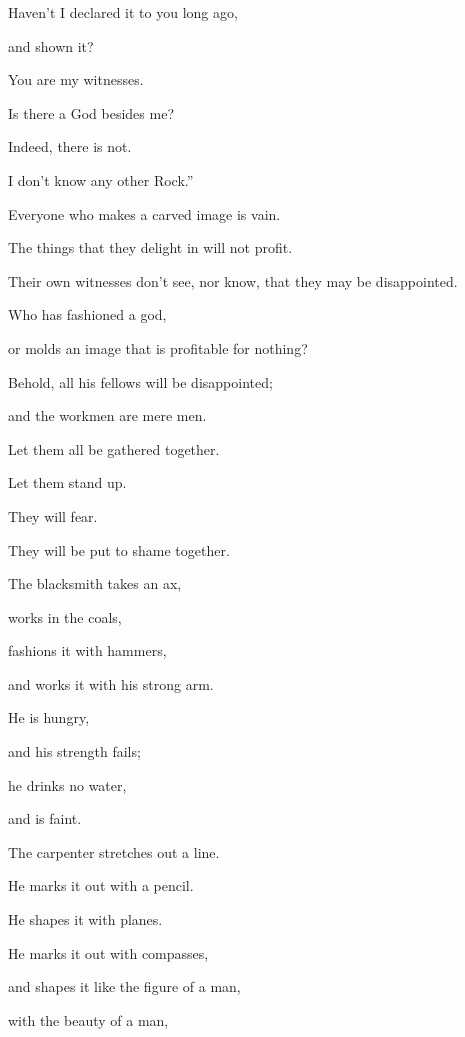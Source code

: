 {\par }{\Q Haven’t I declared it to you long ago,
\par }{\QB and shown it?
\par }{\Q You are my witnesses.
\par }{\QB Is there a God besides me?
\par }{\Q Indeed, there is not.
\par }{\QB I don’t know any other Rock.”
\par }{\BB \par }{\Q {}Everyone who makes a carved image is vain.
\par }{\QB The things that they delight in will not profit.
\par }{\QB Their own witnesses don’t see, nor know, that they may be disappointed.
\par }{\Q {}Who has fashioned a god,
\par }{\QB or molds an image that is profitable for nothing?
\par }{\Q {}Behold, all his fellows will be disappointed;
\par }{\QB and the workmen are mere men.
\par }{\Q Let them all be gathered together.
\par }{\QB Let them stand up.
\par }{\QB They will fear.
\par }{\QB They will be put to shame together.
\par }{\BB \par }{\Q {}The blacksmith takes an ax,
\par }{\QB works in the coals,
\par }{\QB fashions it with hammers,
\par }{\QB and works it with his strong arm.
\par }{\Q He is hungry,
\par }{\QB and his strength fails;
\par }{\Q he drinks no water,
\par }{\QB and is faint.
\par }{\Q {}The carpenter stretches out a line.
\par }{\QB He marks it out with a pencil.
\par }{\QB He shapes it with planes.
\par }{\QB He marks it out with compasses,
\par }{\QB and shapes it like the figure of a man,
\par }{\QB with the beauty of a man,
}
